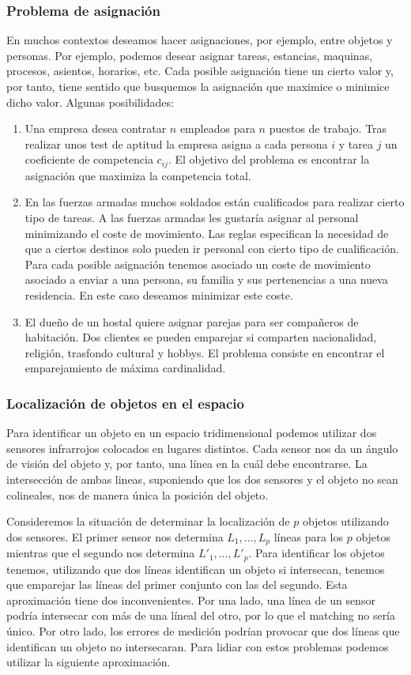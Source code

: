\documentclass[twoside,12pt]{article}
\begin{document}
\subsubsection{Problema de asignación}
En muchos contextos deseamos hacer asignaciones, por ejemplo, entre objetos y personas. Por ejemplo, podemos desear asignar tareas, estancias, maquinas, procesos, asientos, horarios, etc. Cada posible asignación tiene un cierto valor y, por tanto, tiene sentido que busquemos la asignación que maximice o minimice dicho valor. Algunas posibilidades:
\begin{enumerate}
\item Una empresa desea contratar $n$ empleados para $n$ puestos de trabajo. Tras realizar unos test de aptitud la empresa asigna a cada persona $i$ y tarea $j$ un coeficiente de competencia $c_{ij}$. El objetivo del problema es encontrar la asignación que maximiza la competencia total.
\item En las fuerzas armadas muchos soldados están cualificados para realizar cierto tipo de tareas. A las fuerzas armadas les gustaría asignar al personal minimizando el coste de movimiento. Las reglas especifican la necesidad de que a ciertos destinos solo pueden ir personal con cierto tipo de cualificación. Para cada posible asignación tenemos asociado un coste de movimiento asociado a enviar a una persona, su familia y sus pertenencias a una nueva residencia. En este caso deseamos minimizar este coste.
\item El dueño de un hostal quiere asignar parejas para ser compañeros de habitación. Dos clientes se pueden emparejar si comparten nacionalidad, religión, trasfondo cultural y hobbys. El problema consiste en encontrar el emparejamiento de máxima cardinalidad.
\end{enumerate}
\subsubsection{Localización de objetos en el espacio}
Para identificar un objeto en un espacio tridimensional podemos utilizar dos sensores infrarrojos colocados en lugares distintos. Cada sensor nos da un ángulo de visión del objeto y, por tanto, una línea en la cuál debe encontrarse. La intersección de ambas lineas, suponiendo que los dos sensores y el objeto no sean colineales, nos de manera única la posición del objeto. 

Consideremos la situación de determinar la localización de $p$ objetos utilizando dos sensores. El primer sensor nos determina $L_1,\dotsc,L_p$ líneas para los $p$ objetos mientras que el segundo nos determina $L'_1,\dotsc,L'_p$. Para identificar los objetos tenemos, utilizando que dos líneas identifican un objeto si intersecan, tenemos que emparejar las líneas del primer conjunto con las del segundo. Esta aproximación tiene dos inconvenientes. Por una lado, una línea de un sensor podría intersecar con más de una líneal del otro, por lo que el matching no sería único. Por otro lado, los errores de medición podrían provocar que dos líneas que identifican un objeto no intersecaran. Para lidiar con estos problemas podemos utilizar la siguiente aproximación. 
\end{document}
